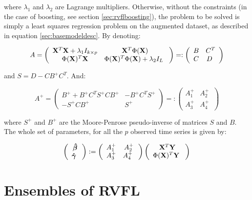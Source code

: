\medskip

where $\lambda_1$ and $\lambda_2$ are Lagrange multipliers. Otherwise, without the constraints (in the case of boosting, see section \ref{sec:rvflboosting}), the problem to be solved is simply a least squares regression problem on the augmented dataset, as described in equation \ref{sec:basemodeldesc}. By denoting:

$$ A = \left( {\begin{array}{cc} {\bf X}^T{\bf X} + \lambda_1 I_{k\times p} &  {\bf X}^T\Phi({\bf X})\\
\Phi({\bf X})^T{\bf X} & \Phi({\bf X})^T\Phi({\bf X}) + \lambda_2 I_{L} \      \end{array} } \right) =:
\left( {\begin{array}{cc} B &  C^T\\ C & D \      \end{array} } \right) $$

and $S = D - CB^+C^T$. And:

$$
A^+ = \left( {\begin{array}{cc} B^+ + B^+ C^T
S^+ CB^+  &  -B^+ C^T S^+\\ -S^+CB^+ & S^+ \      \end{array} } \right) =:
\left( {\begin{array}{cc} A_1^+  &  A_2^+\\ A_3^+ & A_4^+ \      \end{array} }
\right)
$$


where $S^+$ and $B^+$ are the Moore-Penrose pseudo-inverse of matrices $S$ and
$B$. The whole set of parameters, for all the $p$ observed time series is given by:

$$
\left( {\begin{array}{c} \bm{\hat{\beta}} \\       \bm{\hat{\gamma}} \      \end{array}
} \right) := \left( {\begin{array}{cc} A_1^+  &  A_2^+\\ A_3^+ & A_4^+ \      \end{array}
} \right)\left( {\begin{array}{c} {\bf X}^T{\bf Y} \\       \Phi({\bf X})^T{\bf Y} \      \end{array} }
\right)
$$

\section{Ensembles of RVFL}
\label{sec:ensemblemethods}

